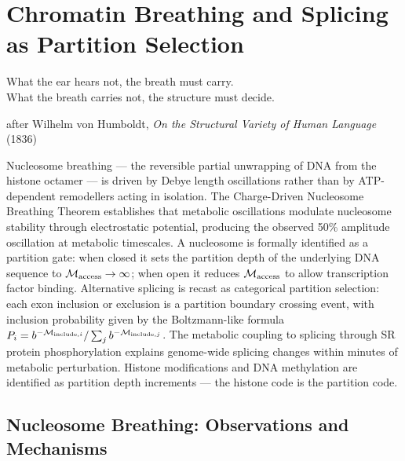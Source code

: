 
\chapter{Chromatin Breathing and Splicing as Partition Selection}
\label{chap:chromatin_splicing}

\epigraph{%
  What the ear hears not, the breath must carry.\\
  What the breath carries not, the structure must decide.%
}{after Wilhelm von Humboldt, \textit{On the Structural Variety of Human Language} (1836)}

\begin{chapterbox}
Nucleosome breathing --- the reversible partial unwrapping of DNA from the
histone octamer --- is driven by Debye length oscillations rather than by
ATP-dependent remodellers acting in isolation. The Charge-Driven Nucleosome
Breathing Theorem establishes that metabolic oscillations modulate nucleosome
stability through electrostatic potential, producing the observed 50\%
amplitude oscillation at metabolic timescales. A nucleosome is formally
identified as a partition gate: when closed it sets the partition depth of
the underlying DNA sequence to $\mathcal{M}_{\mathrm{access}} \to \infty$; when
open it reduces $\mathcal{M}_{\mathrm{access}}$ to allow transcription factor
binding. Alternative splicing is recast as categorical partition selection:
each exon inclusion or exclusion is a partition boundary crossing event, with
inclusion probability given by the Boltzmann-like formula
$P_i = b^{-\mathcal{M}_{\mathrm{include},i}}/\sum_j b^{-\mathcal{M}_{\mathrm{include},j}}$.
The metabolic coupling to splicing through SR protein phosphorylation explains
genome-wide splicing changes within minutes of metabolic perturbation.
Histone modifications and DNA methylation are identified as partition depth
increments --- the histone code is the partition code.
\end{chapterbox}

\section{Nucleosome Breathing: Observations and Mechanisms}
\label{sec:breathing_overview}


